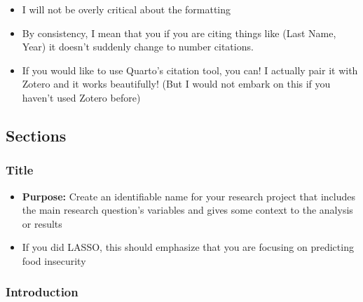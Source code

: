 \documentclass[
  letterpaper,
  DIV=11,
  numbers=noendperiod]{scrartcl}
\providecommand{\tightlist}{%
  \setlength{\itemsep}{0pt}\setlength{\parskip}{0pt}}\usepackage{longtable,booktabs,array}
\begin{document}
\begin{itemize}
  \begin{itemize}
  \tightlist
  \item
    I will not be overly critical about the formatting
  \item
    By consistency, I mean that you if you are citing things like (Last
    Name, Year) it doesn't suddenly change to number citations.
  \item
    If you would like to use Quarto's citation tool, you can! I actually
    pair it with Zotero and it works beautifully! (But I would not
    embark on this if you haven't used Zotero before)
  \end{itemize}
\end{itemize}

\subsection{Sections}\label{sections}

\subsubsection{Title}\label{title}

\begin{itemize}
\tightlist
\item
  \textbf{Purpose:} Create an identifiable name for your research
  project that includes the main research question's variables and gives
  some context to the analysis or results
\item
  If you did LASSO, this should emphasize that you are focusing on
  predicting food insecurity
\end{itemize}

\subsubsection{Introduction}\label{introduction}
\end{document}
